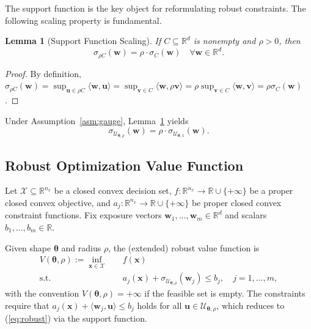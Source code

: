 \documentclass[lettersize,journal]{IEEEtran}
\newcommand{\R}{\mathbb{R}}
\newcommand{\cU}{\mathcal{U}}
\newcommand{\cX}{\mathcal{X}}
\newcommand{\ip}[2]{\langle #1, #2 \rangle}
\newcommand{\btheta}{\bm{\theta}}
\newcommand{\bu}{\bm{u}}
\newcommand{\bw}{\bm{w}}
\newcommand{\bx}{\bm{x}}
\newtheorem{lemma}[theorem]{Lemma}
\theoremstyle{definition}
\begin{document}
The support function is the key object for reformulating robust constraints. The following scaling property is fundamental.

\begin{lemma}[Support Function Scaling]\label{lem:support-scaling}
If $C \subseteq \R^d$ is nonempty and $\rho > 0$, then
\begin{equation}\label{eq:sigma-scale}
\sigma_{\rho C}(\bw) = \rho \cdot \sigma_C(\bw) \quad \forall \bw \in \R^d.
\end{equation}
\end{lemma}

\begin{proof}
By definition, $\sigma_{\rho C}(\bw) = \sup_{\bu \in \rho C} \ip{\bw}{\bu} = \sup_{\bm{v} \in C} \ip{\bw}{\rho \bm{v}} = \rho \sup_{\bm{v} \in C} \ip{\bw}{\bm{v}} = \rho \sigma_C(\bw)$.
\end{proof}

Under Assumption~\ref{asm:gauge}, Lemma~\ref{lem:support-scaling} yields
\begin{equation}
\sigma_{\cU_{\btheta,\rho}}(\bw) = \rho \cdot \sigma_{\cU_{\btheta,1}}(\bw).
\end{equation}

\subsection{Robust Optimization Value Function}

Let $\cX \subseteq \R^{n_x}$ be a closed convex decision set, $f: \R^{n_x} \to \R \cup \{+\infty\}$ be a proper closed convex objective, and $a_j: \R^{n_x} \to \R \cup \{+\infty\}$ be proper closed convex constraint functions. Fix exposure vectors $\bw_1, \ldots, \bw_m \in \R^d$ and scalars $b_1, \ldots, b_m \in \R$.

Given shape $\btheta$ and radius $\rho$, the (extended) robust value function is
\begin{equation}\label{eq:robust}
\begin{aligned}
V(\btheta,\rho) := \inf_{\bx \in \cX} \quad & f(\bx) \\
\text{s.t.} \quad & a_j(\bx) + \sigma_{\cU_{\btheta,\rho}}(\bw_j) \leq b_j, \quad j = 1,\ldots,m,
\end{aligned}
\end{equation}
with the convention $V(\btheta,\rho)=+\infty$ if the feasible set is empty.
The constraints require that $a_j(\bx) + \ip{\bw_j}{\bu} \leq b_j$ holds for all $\bu \in \cU_{\btheta,\rho}$, which reduces to (\ref{eq:robust}) via the support function.
\end{document}
